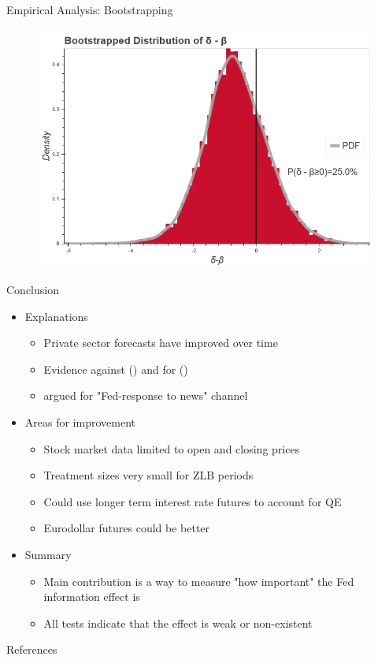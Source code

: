 \documentclass[xcolor=dvipsnames, compress, t]{beamer}
\begin{document}
	\begin{frame}{Empirical Analysis: Bootstrapping}
		\begin{figure}
			\includegraphics[width=.75\textwidth]{charts/bootstrap.png}
		\end{figure}
	\end{frame}
	\begin{frame}{Conclusion}
		\begin{itemize}
			\item<1-> Explanations
			\begin{itemize}
				\item<2-> Private sector forecasts have improved over time
				\item<3-> Evidence against \citeauthor{Nakamura2018} (\citeyear{Nakamura2018}) and for \citeauthor{Bauer2020} (\citeyear{Bauer2020})
				\item<4-> \citeauthor{Bauer2020} argued for "Fed-response to news" channel
			\end{itemize}
			\item<5-> Areas for improvement
			\begin{itemize}
				\item<6-> Stock market data limited to open and closing prices
				\item<7-> Treatment sizes very small for ZLB periods
				\item<8-> Could use longer term interest rate futures to account for QE
				\item<9-> Eurodollar futures could be better
			\end{itemize}
			\item<10-> Summary
			\begin{itemize}
				\item<11-> Main contribution is a way to measure "how important" the Fed information effect is
				\item<12-> All tests indicate that the effect is weak or non-existent 
			\end{itemize}
		\end{itemize}
	\end{frame}
	\begin{frame}{References}
		\bibbysection
	\end{frame}
\end{document}
